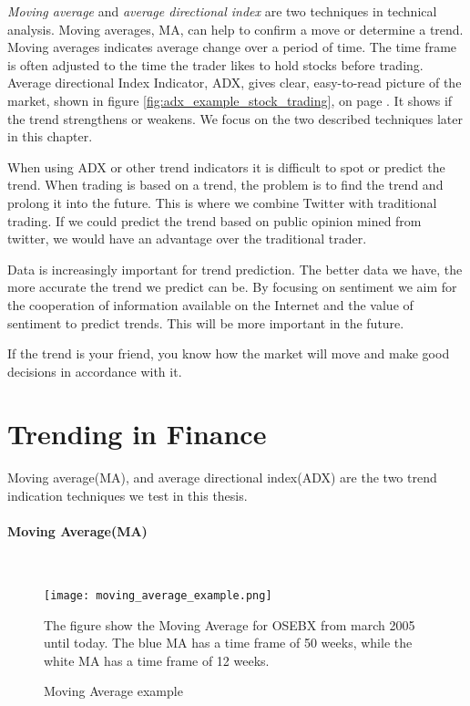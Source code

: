 \textit{Moving average} and \textit{average directional index} are two
techniques in technical analysis. Moving averages, MA, can help to confirm a
move or determine a trend. Moving averages indicates average change over a
period of time. The time frame is often adjusted to the time the trader likes to
hold stocks before trading. Average directional Index Indicator, ADX, gives
clear, easy-to-read picture of the market, shown in figure
\ref{fig:adx_example_stock_trading}, on page
\pageref{fig:adx_example_stock_trading}. It shows if the trend strengthens or
weakens. We focus on the two described techniques later in this chapter.

When using ADX or other trend indicators it is difficult to spot or predict the
trend. When trading is based on a trend, the problem is to find
the trend and prolong it into the future. This is where we combine Twitter
with traditional trading. If we could predict the trend based on public opinion
mined from twitter, we would have an advantage over the traditional trader. 

Data is increasingly important for trend prediction. The better data we have,
the more accurate the trend we predict can be. By focusing on sentiment we aim
for the cooperation of information available on the Internet and the value of
sentiment to predict trends. This will be more important in the future. 

If the trend is your friend, you know how the market will move and make
good decisions in accordance with it. 
%

\section{Trending in Finance}\label{trend:trends_in_finance}
Moving average(MA), and average directional index(ADX) are the two trend
indication techniques we test in this thesis. 

\paragraph{Moving Average(MA)}
\hspace{0pt}\\
\begin{figure}[htb]
    \centering
    \texttt{[image: moving\_average\_example.png]}
    \label{fig:moving_average_example}
    \caption{Moving Average example}
The figure show the Moving Average for OSEBX from march 2005 until today. The
blue MA has a time frame of 50 weeks, while the white MA has a time frame of 12
weeks. 
\end{figure}

